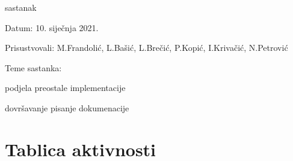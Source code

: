 \begin{packed_enum}
			\item sastanak
			\item[] \begin{packed_item}
				\item Datum: 10. siječnja 2021.
				\item Prisustvovali: M.Frandolić, L.Bašić, L.Brečić, P.Kopić, I.Krivačić, N.Petrović
				\item Teme sastanka:
				\begin{packed_item}
					\item podjela preostale implementacije
					\item dovršavanje pisanje dokumenacije
				\end{packed_item}
			\end{packed_item}
		
		\end{packed_enum}
		
		\eject
		\section*{Tablica aktivnosti}
			
